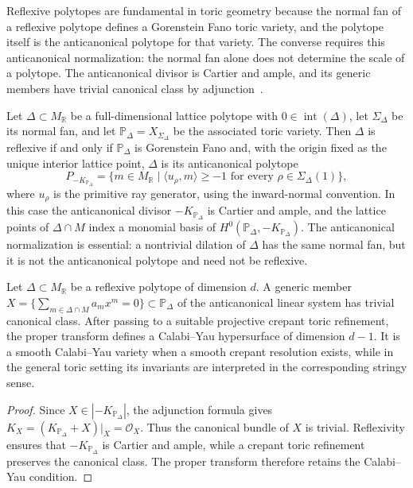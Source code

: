 \documentclass[appliedmath,article,submit,moreauthors]{Definitions/mdpi}
\newcommand{\RR}{\mathbb{R}}
\newcommand{\interior}{\operatorname{int}}
\begin{document}
{\color{blue}Reflexive polytopes are fundamental in toric geometry because the
normal fan of a reflexive polytope defines a Gorenstein Fano toric variety, and
the polytope itself is the anticanonical polytope for that variety. The converse
requires this anticanonical normalization: the normal fan alone does not
determine the scale of a polytope. The anticanonical divisor is Cartier and
ample, and its generic members have trivial canonical class by
adjunction~\cite{Batyrev1994}.}

\begin{Theorem}
\label{thm:fano}
{\color{blue}
Let \(\Delta\subset M_{\RR}\) be a full-dimensional lattice polytope with
\(0\in\interior(\Delta)\), let \(\Sigma_{\Delta}\) be its normal fan, and let
\(\mathbb{P}_{\Delta}=X_{\Sigma_{\Delta}}\) be the associated toric variety.
Then \(\Delta\) is reflexive if and only if \(\mathbb{P}_{\Delta}\) is
Gorenstein Fano and, with the origin fixed as the unique interior lattice
point, \(\Delta\) is its anticanonical polytope
\[
P_{-K_{\mathbb{P}_{\Delta}}}
=
\{m\in M_{\RR}\mid \langle u_{\rho},m\rangle\geq-1
\text{ for every }\rho\in\Sigma_{\Delta}(1)\},
\]
where \(u_{\rho}\) is the primitive ray generator, using the inward-normal
convention. In this case the anticanonical divisor
\(-K_{\mathbb{P}_{\Delta}}\) is Cartier and ample, and the lattice points of
\(\Delta\cap M\) index a monomial basis of
\(H^0(\mathbb{P}_{\Delta},-K_{\mathbb{P}_{\Delta}})\). The anticanonical
normalization is essential: a nontrivial dilation of \(\Delta\) has the same
normal fan, but it is not the anticanonical polytope and need not be reflexive.
}
\end{Theorem}

\begin{Theorem}
\label{thm:batyrev}
Let \(\Delta\subset M_{\RR}\) be a reflexive polytope of dimension \(d\). A
generic member
\(X=\{\sum_{m\in\Delta\cap M}a_mx^m=0\}\subset\mathbb{P}_{\Delta}\) of the
anticanonical linear system has trivial canonical class. After passing to a
suitable projective crepant toric refinement, the proper transform defines a
Calabi--Yau hypersurface of dimension \(d-1\). It is a smooth Calabi--Yau
variety when a smooth crepant resolution exists, while in the general toric
setting its invariants are interpreted in the corresponding stringy sense.
\end{Theorem}

\begin{proof}
Since \(X\in|-K_{\mathbb{P}_{\Delta}}|\), the adjunction formula gives
\(K_X=(K_{\mathbb{P}_{\Delta}}+X)|_X=\mathcal{O}_X\). Thus the canonical bundle
of \(X\) is trivial. Reflexivity ensures that \(-K_{\mathbb{P}_{\Delta}}\) is
Cartier and ample, while a crepant toric refinement preserves the canonical
class. The proper transform therefore retains the Calabi--Yau condition.
\end{proof}
\end{document}

